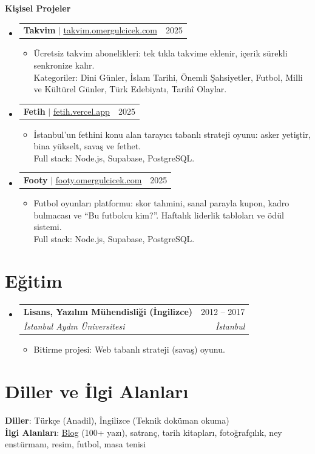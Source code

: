\documentclass[a4paper,11pt]{article}
\makeatletter
\newcommand{\resumeItem}[1]{
  \item\small{
    {#1 \vspace{-2pt}}
  }
}
\newcommand{\resumeSubheading}[4]{
  \vspace{-2pt}\item
    \begin{tabular*}{0.97\textwidth}[t]{l@{\extracolsep{\fill}}r}
      \textbf{#1} & \small #2 \\
      \textit{\small#3} & \textit{\small #4} \\
    \end{tabular*}\vspace{-7pt}
}
\newcommand{\resumeProjectHeading}[2]{
    \item
    \begin{tabular*}{0.97\textwidth}{l@{\extracolsep{\fill}}r}
      \small#1 & \small #2 \\
    \end{tabular*}\vspace{-7pt}
}
\newcommand{\resumeSubHeadingListStart}{\begin{itemize}[leftmargin=0.15in, label={}]}
\newcommand{\resumeSubHeadingListEnd}{\end{itemize}}
\newcommand{\resumeItemListStart}{\begin{itemize}}
\newcommand{\resumeItemListEnd}{\end{itemize}\vspace{3pt}}
\makeatother
\begin{document}
  \vspace{4pt}
  {\small \textbf{Kişisel Projeler}\par}
    \resumeSubHeadingListStart
      \resumeProjectHeading
          {\textbf{Takvim} $|$ \href{https://takvim.omergulcicek.com}{\underline{takvim.omergulcicek.com}}}{2025}
          \resumeItemListStart
            \resumeItem{Ücretsiz takvim abonelikleri: tek tıkla takvime eklenir, içerik sürekli senkronize kalır. \\ Kategoriler: Dini Günler, İslam Tarihi, Önemli Şahsiyetler, Futbol, Milli ve Kültürel Günler, Türk Edebiyatı, Tarihî Olaylar.}
          \resumeItemListEnd

      \resumeProjectHeading
          {\textbf{Fetih} $|$ \href{https://fetih.vercel.app}{\underline{fetih.vercel.app}}}{2025}
          \resumeItemListStart
            \resumeItem{İstanbul'un fethini konu alan tarayıcı tabanlı strateji oyunu: asker yetiştir, bina yükselt, savaş ve fethet. \\ Full stack: Node.js, Supabase, PostgreSQL.}
          \resumeItemListEnd

      \resumeProjectHeading
          {\textbf{Footy} $|$ \href{https://footy.omergulcicek.com}{\underline{footy.omergulcicek.com}}}{2025}
          \resumeItemListStart
            \resumeItem{Futbol oyunları platformu: skor tahmini, sanal parayla kupon, kadro bulmacası ve ``Bu futbolcu kim?''. Haftalık liderlik tabloları ve ödül sistemi. \\ Full stack: Node.js, Supabase, PostgreSQL.}
          \resumeItemListEnd
    \resumeSubHeadingListEnd

\section{Eğitim}
  \resumeSubHeadingListStart
    \resumeSubheading
      {Lisans, Yazılım Mühendisliği (İngilizce)}{2012 -- 2017}
      {İstanbul Aydın Üniversitesi}{İstanbul}
      \resumeItemListStart
        \resumeItem{Bitirme projesi: Web tabanlı strateji (savaş) oyunu.}
      \resumeItemListEnd
  \resumeSubHeadingListEnd

\section{Diller ve İlgi Alanları}
  {\small
    \textbf{Diller}: Türkçe (Anadil), İngilizce (Teknik doküman okuma) \\
    \textbf{İlgi Alanları}: \href{https://omergulcicek.com/blog}{\underline{Blog}} (100+ yazı), satranç, tarih kitapları, fotoğrafçılık, ney enstürmanı, resim, futbol, masa tenisi\par
  }
\end{document}
